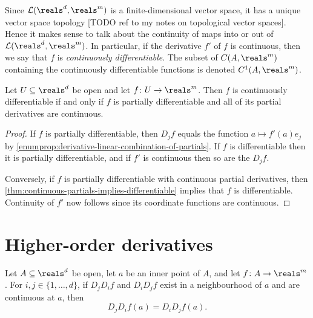 \documentclass[article, a4paper, 11pt, oneside]{memoir}
\numberwithin{equation}{chapter}
\newcommand{\calL}{\mathcal{L}}
\begin{document}
Since $\calL(\reals^d,\reals^m)$ is a finite-dimensional vector space, it has a unique vector space topology [TODO ref to my notes on topological vector spaces]. Hence it makes sense to talk about the continuity of maps into or out of $\calL(\reals^d,\reals^m)$. In particular, if the derivative $f'$ of $f$ is continuous, then we say that $f$ is \emph{continuously differentiable}. The subset of $C(A,\reals^m)$ containing the continuously differentiable functions is denoted $C^1(A,\reals^m)$.

\begin{corollary}
    Let $U \subseteq \reals^d$ be open and let $f \colon U \to \reals^m$. Then $f$ is continuously differentiable if and only if $f$ is partially differentiable and all of its partial derivatives are continuous.
\end{corollary}

\begin{proof}
    If $f$ is partially differentiable, then $D_j f$ equals the function $a \mapsto f'(a) e_j$ by \cref{enumprop:derivative-linear-combination-of-partials}. If $f$ is differentiable then it is partially differentiable, and if $f'$ is continuous then so are the $D_j f$.

    Conversely, if $f$ is partially differentiable with continuous partial derivatives, then \cref{thm:continuous-partials-implies-differentiable} implies that $f$ is differentiable. Continuity of $f'$ now follows since its coordinate functions are continuous.
\end{proof}


\section{Higher-order derivatives}

\begin{theorem}
    Let $A \subseteq \reals^d$ be open, let $a$ be an inner point of $A$, and let $f \colon A \to \reals^m$. For $i,j \in \{1, \ldots, d\}$, if $D_j D_i f$ and $D_i D_j f$ exist in a neighbourhood of $a$ and are continuous at $a$, then
    \begin{equation*}
        D_j D_i f(a)
            = D_i D_j f(a).
    \end{equation*}
\end{theorem}
\end{document}
